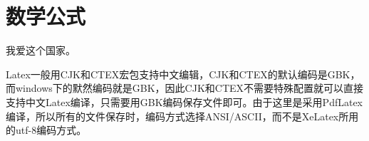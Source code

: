 ﻿
\chapter{数学公式}
\label{chap:math}

我爱\cite{lshort-cn}这个国家\supercite{lshort-cn}。

Latex一般用CJK和CTEX宏包支持中文编辑，CJK和CTEX的默认编码是GBK，而windows下的默然编码就是GBK，因此CJK和CTEX不需要特殊配置就可以直接支持中文Latex编译，只需要用GBK编码保存文件即可。由于这里是采用PdfLatex编译，所以所有的文件保存时，编码方式选择ANSI/ASCII，而不是XeLatex所用的utf-8编码方式。